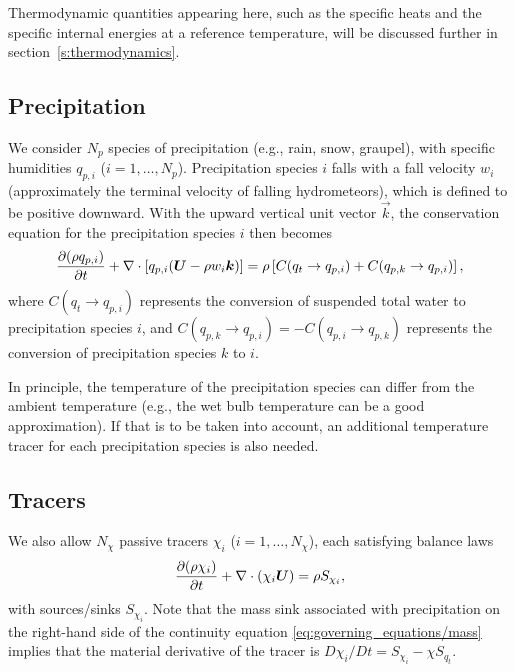 \documentclass{article}
\begin{document}
Thermodynamic quantities appearing here, such as the specific heats and the specific internal energies at a reference temperature, will be discussed further in section~\ref{s:thermodynamics}.

\subsection{Precipitation}

We  consider $N_p$ species of precipitation (e.g., rain, snow, graupel), with specific humidities $q_{p,i}$ ($i=1,\dots,N_p$). Precipitation species $i$ falls with a fall velocity $w_i$ (approximately the terminal velocity of falling hydrometeors), which is defined to be positive downward. With the upward vertical unit vector $\vec{k}$, the conservation equation for the precipitation species $i$ then becomes
\begin{equation}
\frac{\partial (\rho q_{p,i})}{\partial t} + \nabla \cdot \left[q_{p,i} (\boldsymbol{{U}} - \rho w_i \boldsymbol{{k}}) \right] = \rho \left[C(q_t \rightarrow q_{p,i}) + C(q_{p,k} \rightarrow q_{p,i}) \right],   
\label{eq:precip}
\end{equation}
where $C(q_t \rightarrow q_{p,i})$ represents the conversion of suspended total water to precipitation species $i$, and $C(q_{p,k} \rightarrow q_{p,i}) = -C(q_{p,i} \rightarrow q_{p,k})$ represents the conversion of precipitation species $k$ to $i$. 

In principle, the temperature of the precipitation species can differ from the ambient temperature (e.g., the wet bulb temperature can be a good approximation). If that is to be taken into account, an additional temperature tracer for each precipitation species is also needed.

\subsection{Tracers}

We also allow $N_\chi$ passive tracers $\chi_i$ ($i=1, \dots, N_\chi$), each satisfying balance laws
\begin{equation}
\frac{\partial (\rho \chi_i)}{\partial t} + \nabla \cdot \left(\chi_i \boldsymbol{{U}} \right) = \rho S_{\chi_i},   
\label{eq:tracers}
\end{equation}
with sources/sinks $S_{\chi_i}$. Note that the mass sink associated with precipitation on the right-hand side of the continuity equation \eqref{eq:governing_equations/mass} implies that the material derivative of the tracer is $D\chi_i/Dt = S_{\chi_i} - \chi S_{q_t}$.
 
\end{document}
